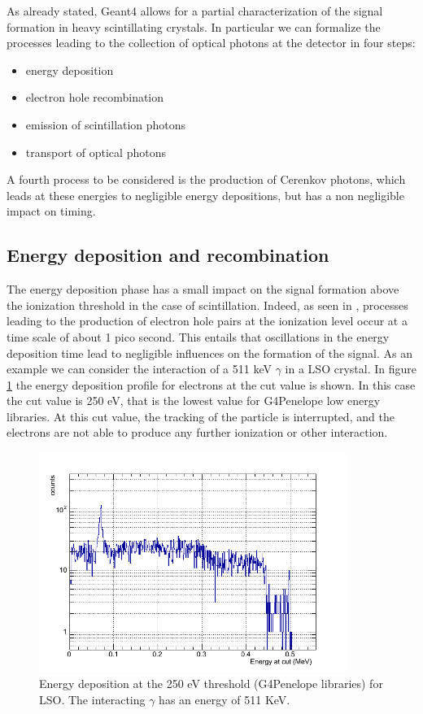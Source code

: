 As already stated, Geant4 allows for a partial characterization of the signal formation in heavy scintillating crystals.
In particular we can formalize the processes leading to the collection of optical photons at the detector in four steps:
\begin{itemize}
\item energy deposition
\item electron hole recombination
\item emission of scintillation photons
\item transport of optical photons
\end{itemize}
A fourth process to be considered is the production of Cerenkov photons, which leads at these energies to negligible energy depositions, but has a non negligible impact on timing.

\subsection{Energy deposition and recombination}
The energy deposition phase has a small impact on the signal formation above the ionization threshold in the case of scintillation. Indeed, as seen in \cite{Lecoq2006}, processes leading to the production of electron hole pairs at the ionization level occur at a time scale of about 1 pico second. This entails that oscillations in the energy deposition time lead to negligible influences on the formation of the signal. As an example we can consider the interaction of a 511 keV $\gamma$ in a LSO crystal. In figure \ref{fig:energy_dep} the energy deposition profile for electrons at the cut value is shown. In this case the cut value is 250 eV, that is the lowest value for G4Penelope low energy libraries. At this cut value, the tracking of the particle is interrupted, and the electrons are not able to produce any further ionization or other interaction.  
\begin{figure}[htbp]
\begin{center}
\includegraphics[width=10cm]{../Pictures/Chapter_6/energy_und_thr.png}
\end{center}
\caption[Energy deposition at 250 eV]{Energy deposition at the 250 eV threshold (G4Penelope libraries) for LSO. The interacting $\gamma$ has an energy of 511 KeV.}
\label{fig:energy_dep}
\end{figure}

